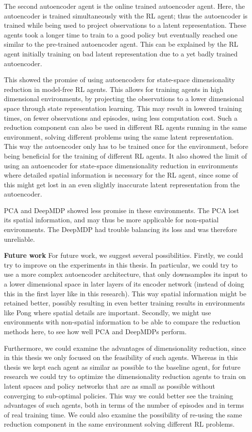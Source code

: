 The second autoencoder agent is the online trained autoencoder agent. Here, the autoencoder is trained simultaneously with the RL agent; thus the autoencoder is trained while being used to project observations to a latent representation. These agents took a longer time to train to a good policy but eventually reached one similar to the pre-trained autoencoder agent. This can be explained by the RL agent initially training on bad latent representation due to a yet badly trained autoencoder.

This showed the promise of using autoencoders for state-space dimensionality reduction in model-free RL agents. This allows for training agents in high dimensional environments, by projecting the observations to a lower dimensional space through state representation learning. This may result in lowered training times, on fewer observations and episodes, using less computation cost. Such a reduction component can also be used in different RL agents running in the same environment, solving different problems using the same latent representation. This way the autoencoder only has to be trained once for the environment, before being beneficial for the training of different RL agents. It also showed the limit of using an autoencoder for state-space dimensionality reduction in environments where detailed spatial information is necessary for the RL agent, since some of this might get lost in an even slightly inaccurate latent representation from the autoencoder.

PCA and DeepMDP showed less promise in these environments. The PCA lost its spatial information, and may thus be more applicable for non-spatial environments. The DeepMDP had trouble balancing its loss and was therefore unreliable.\newline

\noindent\textbf{Future work}\newline
\noindent For future work, we suggest several possibilities. Firstly, we could try to improve on the experiments in this thesis. In particular, we could try to use a more complex autoencoder architecture, that only downsamples its input to a lower dimensional space in later layers of its encoder network (instead of doing this in the first layer like in this research). This way spatial information might be retained better, possibly resulting in even better training results in environments like Pong where spatial details are important. Secondly, we might use environments with non-spatial information to be able to compare the reduction methods here, to see how well PCA and DeepMDPs perform. 

Furthermore, we could examine the advantages of dimensionality reduction, since in this thesis we only focused on the feasibility of such agents. Whereas in this thesis we kept each agent as similar as possible to the baseline agent, for future research we could try to optimize the dimensionality reduction agents to train on latent spaces and policy networks that are as small as possible without converging to sub-optimal policies. This way we could better see the training advantages of such agents, both in terms of the number of episodes and in terms of real training time. We could also examine the possibility of re-using the same reduction component in the same environment solving different RL problems.